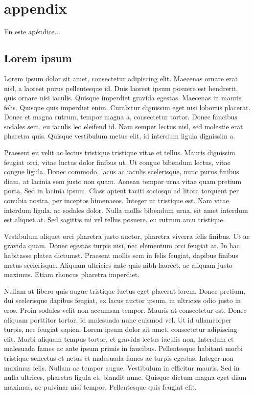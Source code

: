 \chapter{appendix}

En este apéndice...


\section{Lorem ipsum}
Lorem ipsum dolor sit amet, consectetur adipiscing elit. Maecenas ornare erat nisl, a laoreet purus pellentesque id. Duis laoreet ipsum posuere est hendrerit, quis ornare nisi iaculis. Quisque imperdiet gravida egestas. Maecenas in mauris felis. Quisque quis imperdiet enim. Curabitur dignissim eget nisi lobortis placerat. Donec et magna rutrum, tempor magna a, consectetur tortor. Donec faucibus sodales sem, eu iaculis leo eleifend id. Nam semper lectus nisl, sed molestie erat pharetra quis. Quisque vestibulum metus elit, id interdum ligula dignissim a.

Praesent eu velit ac lectus tristique tristique vitae et tellus. Mauris dignissim feugiat orci, vitae luctus dolor finibus ut. Ut congue bibendum lectus, vitae congue ligula. Donec commodo, lacus ac iaculis scelerisque, nunc purus finibus diam, at lacinia sem justo non quam. Aenean tempor urna vitae quam pretium porta. Sed in lacinia ipsum. Class aptent taciti sociosqu ad litora torquent per conubia nostra, per inceptos himenaeos. Integer ut tristique est. Nam vitae interdum ligula, ac sodales dolor. Nulla mollis bibendum urna, sit amet interdum est aliquet at. Sed sagittis mi vel tellus posuere, eu rutrum arcu tristique.

Vestibulum aliquet orci pharetra justo auctor, pharetra viverra felis finibus. Ut ac gravida quam. Donec egestas turpis nisi, nec elementum orci feugiat at. In hac habitasse platea dictumst. Praesent mollis sem in felis feugiat, dapibus finibus metus scelerisque. Aliquam ultricies ante quis nibh laoreet, ac aliquam justo maximus. Etiam rhoncus pharetra imperdiet.

Nullam at libero quis augue tristique luctus eget placerat lorem. Donec pretium, dui scelerisque dapibus feugiat, ex lacus auctor ipsum, in ultricies odio justo in eros. Proin sodales velit non accumsan tempor. Mauris at consectetur est. Donec aliquam porttitor tortor, id malesuada nunc euismod vel. Ut id ullamcorper turpis, nec feugiat sapien. Lorem ipsum dolor sit amet, consectetur adipiscing elit. Morbi aliquam tempus tortor, et gravida lectus iaculis non. Interdum et malesuada fames ac ante ipsum primis in faucibus. Pellentesque habitant morbi tristique senectus et netus et malesuada fames ac turpis egestas. Integer non maximus felis. Nullam ac tempor augue. Vestibulum in efficitur mauris. Sed in nulla ultrices, pharetra ligula et, blandit nunc. Quisque dictum magna eget diam maximus, ac pulvinar nisi tempor. Pellentesque quis feugiat elit.

